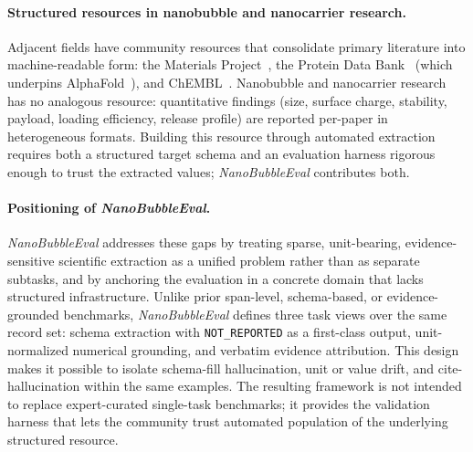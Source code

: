 \documentclass{article}
\newcommand{\NR}{\texttt{NOT\_REPORTED}}
\begin{document}
\paragraph{Structured resources in nanobubble and nanocarrier research.}
Adjacent fields have community resources that consolidate primary literature into machine-readable form: the Materials Project~\citep{jain2013materials}, the Protein Data Bank~\citep{berman2000pdb} (which underpins AlphaFold~\citep{jumper2021highly}), and ChEMBL~\citep{gaulton2012chembl}. Nanobubble and nanocarrier research has no analogous resource: quantitative findings (size, surface charge, stability, payload, loading efficiency, release profile) are reported per-paper in heterogeneous formats. Building this resource through automated extraction requires both a structured target schema and an evaluation harness rigorous enough to trust the extracted values; \textit{NanoBubbleEval} contributes both.

\paragraph{Positioning of \textit{NanoBubbleEval}.}
\textit{NanoBubbleEval} addresses these gaps by treating sparse, unit-bearing, evidence-sensitive scientific extraction as a unified problem rather than as separate subtasks, and by anchoring the evaluation in a concrete domain that lacks structured infrastructure. Unlike prior span-level, schema-based, or evidence-grounded benchmarks, \textit{NanoBubbleEval} defines three task views over the same record set: schema extraction with \NR{} as a first-class output, unit-normalized numerical grounding, and verbatim evidence attribution. This design makes it possible to isolate schema-fill hallucination, unit or value drift, and cite-hallucination within the same examples. The resulting framework is not intended to replace expert-curated single-task benchmarks; it provides the validation harness that lets the community trust automated population of the underlying structured resource.





\end{document}
